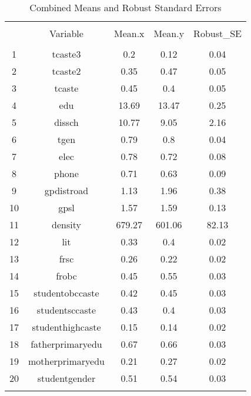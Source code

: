
\begin{table}[!htbp] \centering 
  \caption{Combined Means and Robust Standard Errors} 
  \label{} 
\begin{tabular}{@{\extracolsep{5pt}} ccccc} 
\\[-1.8ex]\hline 
\hline \\[-1.8ex] 
 & Variable & Mean.x & Mean.y & Robust\_SE \\ 
\hline \\[-1.8ex] 
1 & tcaste3 & 0.2 & 0.12 & 0.04 \\ 
2 & tcaste2 & 0.35 & 0.47 & 0.05 \\ 
3 & tcaste & 0.45 & 0.4 & 0.05 \\ 
4 & edu & 13.69 & 13.47 & 0.25 \\ 
5 & dissch & 10.77 & 9.05 & 2.16 \\ 
6 & tgen & 0.79 & 0.8 & 0.04 \\ 
7 & elec & 0.78 & 0.72 & 0.08 \\ 
8 & phone & 0.71 & 0.63 & 0.09 \\ 
9 & gpdistroad & 1.13 & 1.96 & 0.38 \\ 
10 & gpsl & 1.57 & 1.59 & 0.13 \\ 
11 & density & 679.27 & 601.06 & 82.13 \\ 
12 & lit & 0.33 & 0.4 & 0.02 \\ 
13 & frsc & 0.26 & 0.22 & 0.02 \\ 
14 & frobc & 0.45 & 0.55 & 0.03 \\ 
15 & studentobccaste & 0.42 & 0.45 & 0.03 \\ 
16 & studentsccaste & 0.43 & 0.4 & 0.03 \\ 
17 & studenthighcaste & 0.15 & 0.14 & 0.02 \\ 
18 & fatherprimaryedu & 0.67 & 0.66 & 0.03 \\ 
19 & motherprimaryedu & 0.21 & 0.27 & 0.02 \\ 
20 & studentgender & 0.51 & 0.54 & 0.03 \\ 
\hline \\[-1.8ex] 
\end{tabular} 
\end{table} 
